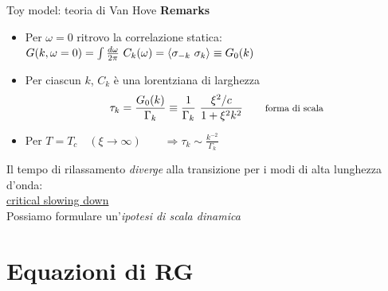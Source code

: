 \documentclass[10pt]{beamer}
\begin{document}
\begin{frame}{Toy model: teoria di Van Hove}
 \textbf{Remarks}
 \begin{itemize}
  \item Per $\omega = 0$ ritrovo la correlazione statica:\\
  $G(k,\omega = 0) = \int \frac{d\omega}{2\pi} \ C_k(\omega) = \mean{\sigma_{-k}\ \sigma_k} \equiv G_0(k)$
  \item Per ciascun $k$, $C_k$ è una lorentziana di larghezza
  \begin{equation*}
   \displaystyle \tau_k = \frac{G_0(k)}{\Gamma_k} \equiv \frac{1}{\Gamma_k}\ \frac{\xi^2/c}{1+\xi^2 k^2}\qquad \text{\footnotesize forma di scala}
  \end{equation*}
  
  \item Per $T = T_c \quad \left( \xi \to \infty\right) \qquad \Longrightarrow \displaystyle \tau_k \sim \frac{k^{-2}}{\Gamma_k}$
 \end{itemize}
 Il tempo di rilassamento \emph{diverge} alla transizione per i modi di alta lunghezza d'onda:\\
    \centering \underline{critical slowing down}\\
Possiamo formulare un'\emph{ipotesi di scala dinamica}

\end{frame}



\section{Equazioni di RG}
\end{document}
